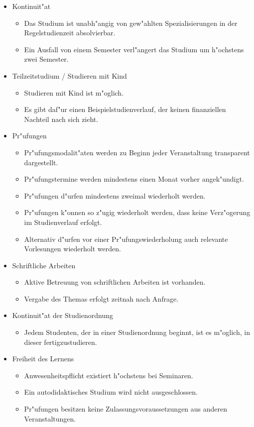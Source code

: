 \begin{itemize}
\item Kontinuit"at
 \begin{itemize}
 \item Das Studium ist unabh"angig von gew"ahlten Spezialisierungen in der Regelstudienzeit absolvierbar.
 \item Ein Ausfall von einem Semester verl"angert das Studium um h"ochstens zwei Semester.
 \end{itemize}

\item Teilzeitstudium / Studieren mit Kind
 \begin{itemize}
 \item Studieren mit Kind ist m"oglich.
 \item Es gibt daf"ur einen Beispielstudienverlauf, der keinen finanziellen Nachteil nach sich zieht.
 \end{itemize}

\item Pr"ufungen
 \begin{itemize}
 \item Pr"ufungsmodalit"aten werden zu Beginn jeder Veranstaltung transparent dargestellt.
 \item Pr"ufungstermine werden mindestens einen Monat vorher angek"undigt.
 \item Pr"ufungen d"urfen mindestens zweimal wiederholt werden.
 \item Pr"ufungen k"onnen so z"ugig wiederholt werden, dass keine Verz"ogerung im Studienverlauf erfolgt.
 \item Alternativ d"urfen vor einer Pr"ufungswiederholung auch relevante Vorlesungen wiederholt werden.
 \end{itemize}

\item Schriftliche Arbeiten
 \begin{itemize}
 \item Aktive Betreuung von schriftlichen Arbeiten ist vorhanden.
 \item Vergabe des Themas erfolgt zeitnah nach Anfrage.
 \end{itemize}

\item Kontinuit"at der Studienordnung
 \begin{itemize}
 \item Jedem Studenten, der in einer Studienordnung beginnt, ist es m"oglich, in dieser fertigzustudieren.
 \end{itemize}

\item Freiheit des Lernens
 \begin{itemize}
 \item Anwesenheitspflicht existiert h"ochstens bei Seminaren.
 \item Ein autodidaktisches Studium wird nicht ausgeschlossen.
 \item Pr"ufungen besitzen keine Zulassungsvoraussetzungen aus anderen Veranstaltungen.
 \end{itemize}


\end{itemize}
